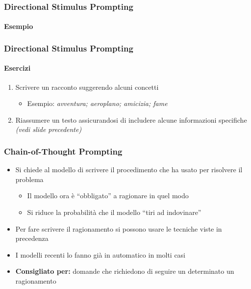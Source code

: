 \begin{exampleframe}
    \frametitle{Directional Stimulus Prompting}
    \framesubtitle{Esempio}


\end{exampleframe}

\begin{exerciseframe}
    \frametitle{Directional Stimulus Prompting}
    \framesubtitle{Esercizi}

    \begin{enumerate}
        \item Scrivere un racconto suggerendo alcuni concetti
        \begin{itemize}
            \item Esempio: \textit{avventura; aeroplano; amicizia; fame}
        \end{itemize}

        \bigskip
        \item Riassumere un testo assicurandosi di includere alcune informazioni specifiche \textit{(vedi slide precedente)}
    \end{enumerate}
\end{exerciseframe}


\begin{contentframe}
    \frametitle{Chain-of-Thought Prompting}

    \begin{itemize}
        \item Si chiede al modello di scrivere il procedimento che ha usato per risolvere il problema
        \begin{itemize}
            \item Il modello ora è ``obbligato'' a ragionare in quel modo
            \item Si riduce la probabilità che il modello ``tiri ad indovinare''
        \end{itemize}
        \item Per fare scrivere il ragionamento si possono usare le tecniche viste in precedenza

        \bigskip
        \item I modelli recenti lo fanno già in automatico in molti casi

        \bigskip
        \item \textbf{Consigliato per:} domande che richiedono di seguire un determinato un ragionamento
    \end{itemize}    
\end{contentframe}

